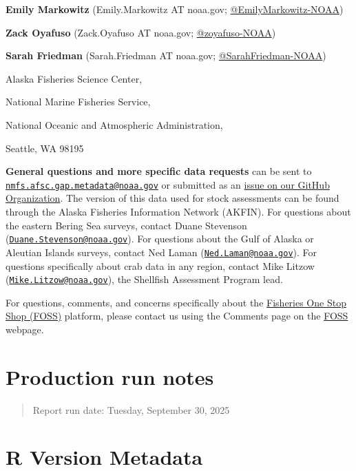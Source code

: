\documentclass[
  letterpaper,
  oneside,
  open=any]{scrbook}
\begin{document}

\textbf{Emily Markowitz} (Emily.Markowitz AT noaa.gov;
\href{https://github.com/EmilyMarkowitz-NOAA}{@EmilyMarkowitz-NOAA})

\textbf{Zack Oyafuso} (Zack.Oyafuso AT noaa.gov;
\href{https://github.com/zoyafuso-NOAA}{@zoyafuso-NOAA})

\textbf{Sarah Friedman} (Sarah.Friedman AT noaa.gov;
\href{https://github.com/SarahFriedman-NOAA}{@SarahFriedman-NOAA})

Alaska Fisheries Science Center,

National Marine Fisheries Service,

National Oceanic and Atmospheric Administration,

Seattle, WA 98195

\textbf{General questions and more specific data requests} can be sent
to
\href{mailto:nmfs.afsc.gap.metadata@noaa.gov}{\nolinkurl{nmfs.afsc.gap.metadata@noaa.gov}}
or submitted as an
\href{https://github.com/afsc-gap-products/data-requests}{issue on our
GitHub Organization}. The version of this data used for stock
assessments can be found through the Alaska Fisheries Information
Network (AKFIN). For questions about the eastern Bering Sea surveys,
contact Duane Stevenson
(\href{mailto:Duane.Stevenson@noaa.gov}{\nolinkurl{Duane.Stevenson@noaa.gov}}).
For questions about the Gulf of Alaska or Aleutian Islands surveys,
contact Ned Laman
(\href{mailto:Ned.Laman@noaa.gov}{\nolinkurl{Ned.Laman@noaa.gov}}). For
questions specifically about crab data in any region, contact Mike
Litzow
(\href{mailto:Mike.Litzow@noaa.gov}{\nolinkurl{Mike.Litzow@noaa.gov}}),
the Shellfish Assessment Program lead.

For questions, comments, and concerns specifically about the
\href{https://www.fisheries.noaa.gov/foss}{Fisheries One Stop Shop
(FOSS)} platform, please contact us using the Comments page on the
\href{https://www.fisheries.noaa.gov/foss}{FOSS} webpage.

\chapter{Production run notes}\label{production-run-notes}

\begin{quote}
Report run date: Tuesday, September 30, 2025
\end{quote}

\chapter{R Version Metadata}\label{r-version-metadata}
\end{document}
